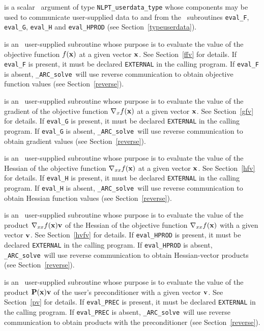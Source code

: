 \documentclass{galahad}
\newcommand{\packagename}{ARC}
\newcommand{\fullpackagename}{\libraryname\_\packagename}
\newcommand{\solver}{{\tt \fullpackagename\_solve}}
\begin{document}
\begin{description}
 is a scalar \intentinout\ argument of type
{\tt NLPT\_userdata\_type} whose components may be used
to communicate user-supplied data to and from the
\optional\ subroutines
{\tt eval\_F}, {\tt eval\_G},
{\tt eval\_H} and {\tt eval\_HPROD}
(see Section~\ref{typeuserdata}).

 is an \optional\
user-supplied subroutine whose purpose is to evaluate the value of the
objective function $f({\mathbf{x}})$ at a given vector ${\mathbf{x}}$.
See Section~\ref{ffv} for details.
If {\tt eval\_F} is present,
it must be declared {\tt EXTERNAL} in the calling program.
If {\tt eval\_F} is absent, \solver\ will use reverse communication to
obtain objective function values (see Section~\ref{reverse}).

 is an \optional\
user-supplied subroutine whose purpose is to evaluate the value of the
gradient of the objective function $\nabla_x f({\mathbf{x}})$ at a given vector ${\mathbf{x}}$.
See Section~\ref{gfv} for details.
If {\tt eval\_G} is present,
it must be declared {\tt EXTERNAL} in the calling program.
If {\tt eval\_G} is absent, \solver\ will use reverse communication to
obtain gradient values (see Section~\ref{reverse}).

 is an \optional\
user-supplied subroutine whose purpose is to evaluate the value of the
Hessian of the objective function $\nabla_{xx} f({\mathbf{x}})$ at a given vector ${\mathbf{x}}$.
See Section~\ref{hfv} for details.
If {\tt eval\_H} is present,
it must be declared {\tt EXTERNAL} in the calling program.
If {\tt eval\_H} is absent, \solver\ will use reverse communication to
obtain Hessian function values (see Section~\ref{reverse}).

\itt{eval\_HPROD} is an \optional\
user-supplied subroutine whose purpose is to evaluate the value of the
product $\nabla_{xx} f({\mathbf{x}}){\mathbf{v}}$ of the Hessian of the objective function
$\nabla_{xx} f({\mathbf{x}})$  with a given vector ${\mathbf{v}}$.
See Section~\ref{hvfv} for details.
If {\tt eval\_HPROD} is present,
it must be declared {\tt EXTERNAL} in the calling program.
If {\tt eval\_HPROD} is absent, \solver\ will use reverse communication to
obtain Hessian-vector products (see Section~\ref{reverse}).

\itt{eval\_PREC} is an \optional\
user-supplied subroutine whose purpose is to evaluate the value of the
product ${\mathbf{P}}({\mathbf{x}}){\mathbf{v}}$ of the user's preconditioner with a given vector
${\mathbf{v}}$. See Section~\ref{pv} for details.
If {\tt eval\_PREC} is present,
it must be declared {\tt EXTERNAL} in the calling program.
If {\tt eval\_PREC} is absent, \solver\ will use reverse communication to
obtain products with the preconditioner (see Section~\ref{reverse}).

\end{description}
\end{document}
